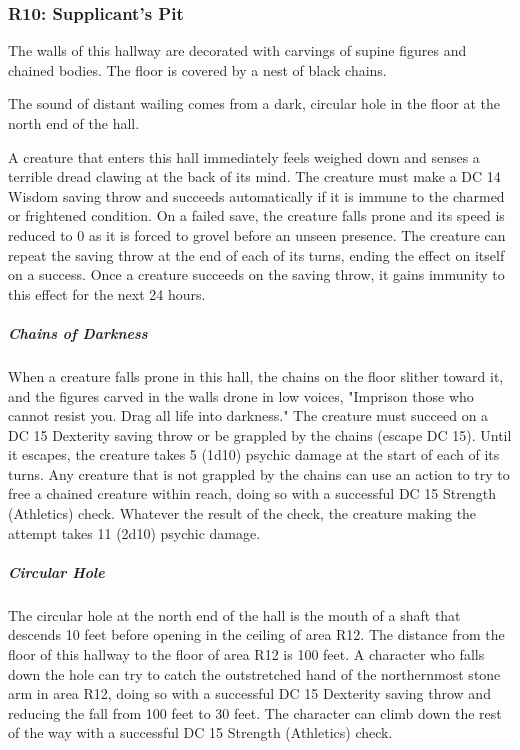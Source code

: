 \documentclass[10pt,a4paper,twoside,bg=print,twocolumn,openany,nodeprecatedcode]{dndbook}
\begin{document}
\subsubsection{R10: Supplicant's Pit}
\begin{DndReadAloud}{}
The walls of this hallway are decorated with carvings of supine figures and chained bodies. The floor is covered by a nest of black chains.

The sound of distant wailing comes from a dark, circular hole in the floor at the north end of the hall.

\end{DndReadAloud}

A creature that enters this hall immediately feels weighed down and senses a terrible dread clawing at the back of its mind. The creature must make a DC 14 Wisdom saving throw and succeeds automatically if it is immune to the charmed or frightened condition. On a failed save, the creature falls prone and its speed is reduced to 0 as it is forced to grovel before an unseen presence. The creature can repeat the saving throw at the end of each of its turns, ending the effect on itself on a success. Once a creature succeeds on the saving throw, it gains immunity to this effect for the next 24 hours.

\subparagraph{Chains of Darkness}
When a creature falls prone in this hall, the chains on the floor slither toward it, and the figures carved in the walls drone in low voices, "Imprison those who cannot resist you. Drag all life into darkness." The creature must succeed on a DC 15 Dexterity saving throw or be grappled by the chains (escape DC 15). Until it escapes, the creature takes 5 (1d10) psychic damage at the start of each of its turns. Any creature that is not grappled by the chains can use an action to try to free a chained creature within reach, doing so with a successful DC 15 Strength (Athletics) check. Whatever the result of the check, the creature making the attempt takes 11 (2d10) psychic damage.

\subparagraph{Circular Hole}
The circular hole at the north end of the hall is the mouth of a shaft that descends 10 feet before opening in the ceiling of area R12. The distance from the floor of this hallway to the floor of area R12 is 100 feet. A character who falls down the hole can try to catch the outstretched hand of the northernmost stone arm in area R12, doing so with a successful DC 15 Dexterity saving throw and reducing the fall from 100 feet to 30 feet. The character can climb down the rest of the way with a successful DC 15 Strength (Athletics) check.
\end{document}
